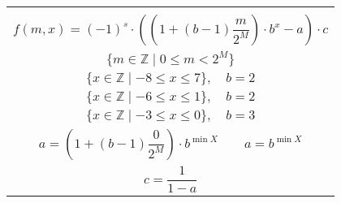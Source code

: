 \documentclass[12pt]{standalone}
\begin{document}
    \begin{minipage}{9cm}

        \begin{tabular}{|c|}
        \hline
        \\

            \vbox{\begin{equation*}
            f(m, x) = (-1)^s \cdot ((1 + (b - 1) \frac{m}{2^{M}}) \cdot b^{x} - a) \cdot c
            \end{equation*}}

        \\

            \vbox{\begin{equation*}
            \{ m \in \mathbb{Z} \mid 0 \leq m < 2^{M} \}
            \end{equation*}}

        \\

            \vbox{\begin{equation*}\tag{4 bits}
            \{ x \in \mathbb{Z} \mid -8 \leq x \leq 7 \},
            \quad
            b = 2
            \end{equation*}}

        \\

            \vbox{\begin{equation*}\tag{3 bits}
            \{ x \in \mathbb{Z} \mid -6 \leq x \leq 1 \},
            \quad
            b = 2
            \end{equation*}}

        \\

            \vbox{\begin{equation*}\tag{2 bits}
            \{ x \in \mathbb{Z} \mid -3 \leq x \leq 0 \},
            \quad
            b = 3
            \end{equation*}}

        \\

            \vbox{\begin{equation*}
            a = (1 + (b - 1) \frac{0}{2^{M}}) \cdot b^{\min{X}}
            \quad \quad
            a = b^{\min{X}}
            \end{equation*}}

        \\

            \vbox{\begin{equation*}
            c = \frac{1}{1 - a}
            \end{equation*}}

        \\
        \hline
        \end{tabular}

    \end{minipage}
\end{document}
